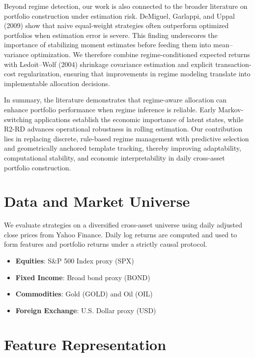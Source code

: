 \documentclass[11pt]{article}
\begin{document}
Beyond regime detection, our work is also connected to the broader literature on portfolio construction under estimation risk. DeMiguel, Garlappi, and Uppal (2009) show that naive equal-weight strategies often outperform optimized portfolios when estimation error is severe. This finding underscores the importance of stabilizing moment estimates before feeding them into mean--variance optimization. We therefore combine regime-conditioned expected returns with Ledoit--Wolf (2004) shrinkage covariance estimation and explicit transaction-cost regularization, ensuring that improvements in regime modeling translate into implementable allocation decisions.

In summary, the literature demonstrates that regime-aware allocation can enhance portfolio performance when regime inference is reliable. Early Markov-switching applications establish the economic importance of latent states, while R2-RD advances operational robustness in rolling estimation. Our contribution lies in replacing discrete, rule-based regime management with predictive selection and geometrically anchored template tracking, thereby improving adaptability, computational stability, and economic interpretability in daily cross-asset portfolio construction.



\section{Data and Market Universe}

We evaluate strategies on a diversified cross-asset universe using daily adjusted close prices from Yahoo Finance.
Daily log returns are computed and used to form features and portfolio returns under a strictly causal protocol.

\begin{itemize}
    \item \textbf{Equities}: S\&P 500 Index proxy (SPX)
    \item \textbf{Fixed Income}: Broad bond proxy (BOND)
    \item \textbf{Commodities}: Gold (GOLD) and Oil (OIL)
    \item \textbf{Foreign Exchange}: U.S. Dollar proxy (USD)
\end{itemize}

\section{Feature Representation}
\label{sec:features}
\end{document}
